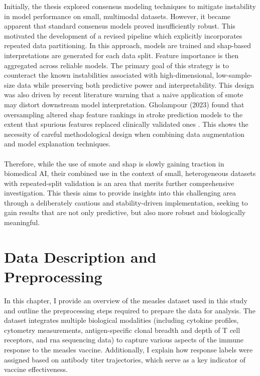 \documentclass[12pt,a4paper]{report}
\begin{document}
Initially, the thesis explored consensus modeling techniques to mitigate instability in model performance on small, multimodal datasets. However, it became apparent that standard consensus models proved insufficiently robust. This motivated the development of a revised pipeline which explicitly incorporates repeated data partitioning. In this approach, models are trained and \acrshort{shap}-based interpretations are generated for each data split. Feature importance is then aggregated across reliable models. The primary goal of this strategy is to counteract the known instabilities associated with high-dimensional, low-sample-size data while preserving both predictive power and interpretability. This design was also driven by recent literature warning that a naive application of \acrshort{smote} may distort downstream model interpretation. Gholampour (2023) found that oversampling altered \acrshort{shap} feature rankings in stroke prediction models to the extent that spurious features replaced clinically validated ones \cite{gholampour2024impact}. This shows the necessity of careful methodological design when combining data augmentation and model explanation techniques.\\
\\
Therefore, while the use of \acrshort{smote} and \acrshort{shap} is slowly gaining traction in biomedical AI, their combined use in the context of small, heterogeneous datasets with repeated-split validation is an area that merits further comprehensive investigation. This thesis aims to provide insights into this challenging area through a deliberately cautious and stability-driven implementation, seeking to gain results that are not only predictive, but also more robust and biologically meaningful.







\pagebreak
\chapter{Data Description and Preprocessing}
\noindent
In this chapter, I provide an overview of the measles dataset used in this study and outline the preprocessing steps required to prepare the data for analysis. The dataset integrates multiple biological modalities (including cytokine profiles, cytometry measurements, antigen-specific clonal breadth and depth of T cell receptors, and \acrshort{rna} sequencing data) to capture various aspects of the immune response to the measles vaccine. Additionally, I explain how response labels were assigned based on antibody titer trajectories, which serve as a key indicator of vaccine effectiveness. 
\end{document}
